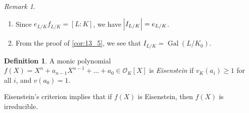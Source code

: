 \documentclass[11pt]{article}
\theoremstyle{definition}
\newtheorem{definition}{Definition}[subsection]
\theoremstyle{plain}
\theoremstyle{remark}
\newtheorem*{remark}{Remark}
\DeclareMathOperator{\Gal}{Gal}
\newcommand{\cO}{\mathcal{O}}
\begin{document}
\begin{remark}\phantom{}
    \begin{enumerate}
        \item Since $e_{L/K} f_{L/K} = [L:K]$, we have $\abs{I_{L/K}} = e_{L/K}$.
        \item From the proof of \autoref{cor:13_5}, we see that $I_{L/K} = \Gal(L/K_0)$.
    \end{enumerate}
\end{remark}

\begin{definition}\label{def:13_7}
    A monic polynomial $f(X) = X^n + a_{n-1} X^{n-1} + \ldots + a_0 \in \cO_K[X]$ is \emph{Eisenstein} if $v_K(a_i) \ge 1$ for all $i$, and $v(a_0) = 1$.
\end{definition}

\noindent Eisenstein's criterion implies that if $f(X)$ is Eisenstein, then $f(X)$ is irreducible.
\end{document}
